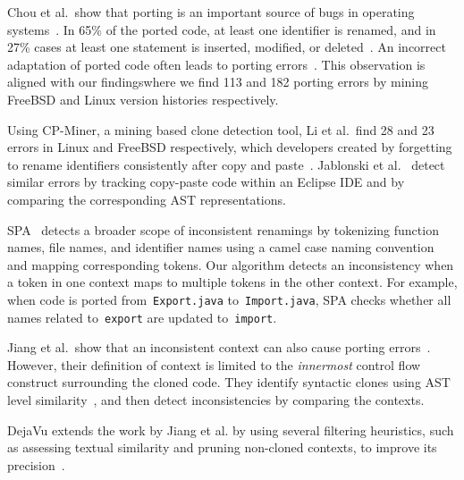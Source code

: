 \documentclass[runningheads,a4paper]{llncs}
\begin{document}
Chou et al.~show that porting is an important source of bugs in
operating systems~\cite{Chou2001:EmpOsError}. In 65\% of the ported
code, at least one identifier is renamed, and in 27\% cases at least
one statement is inserted, modified, or
deleted~\cite{Li2004:CP-Miner}. An incorrect adaptation of ported code
often leads to porting errors~\cite{Jiang2007:clone-bug}. This
observation is aligned with our findings\textemdash where we find 113
and 182 porting errors by mining FreeBSD and Linux version histories
respectively.

Using CP-Miner, a mining based clone detection tool, Li et al.~find 28 and 23
errors in Linux and FreeBSD respectively, which developers created by
forgetting to rename identifiers consistently after copy and
paste~\cite{Li2004:CP-Miner}. Jablonski et
al.~\cite{Jablonski2007:CReN} detect similar errors by tracking
copy-paste code within an Eclipse IDE and by comparing the
corresponding AST representations.  

SPA~\cite{Ray2013:spa} detects a broader scope of inconsistent renamings by tokenizing
function names, file names, and identifier names using a camel case
naming convention and mapping corresponding tokens. Our algorithm
detects an inconsistency when a token in one context maps to multiple
tokens in the other context.  For example, when code is ported
from~\texttt{Export.java} to~\texttt{Import.java}, SPA checks
whether all names related to~\texttt{export} are updated
to~\texttt{import}.

Jiang et al.~show that an inconsistent context can also cause porting
errors~\cite{Jiang2007:clone-bug}. However, their definition of
context is limited to the {\em innermost} control flow construct
surrounding the cloned code. They identify syntactic clones using AST
level similarity~\cite{Jiang2007:deckard}, and then detect
inconsistencies by comparing the contexts. 

DejaVu extends the work by Jiang et al. by using several filtering
heuristics, such as assessing textual similarity and pruning
non-cloned contexts, to improve its
precision~\cite{Gabel2010:dejavu}. 
\end{document}
